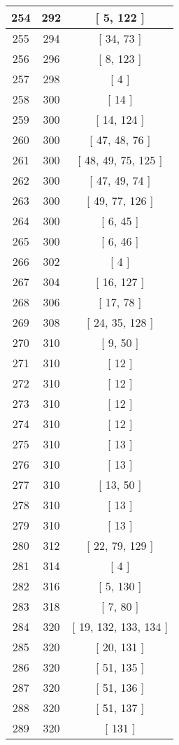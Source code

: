 \begin{center}
\begin{longtable}[H]{|| c c c ||}
\hline
254 & 292 & [ 5, 122 ] \\ 
\hline
255 & 294 & [ 34, 73 ] \\ 
\hline
256 & 296 & [ 8, 123 ] \\ 
\hline
257 & 298 & [ 4 ] \\ 
\hline
258 & 300 & [ 14 ] \\ 
\hline
259 & 300 & [ 14, 124 ] \\ 
\hline
260 & 300 & [ 47, 48, 76 ] \\ 
\hline
261 & 300 & [ 48, 49, 75, 125 ] \\ 
\hline
262 & 300 & [ 47, 49, 74 ] \\ 
\hline
263 & 300 & [ 49, 77, 126 ] \\ 
\hline
264 & 300 & [ 6, 45 ] \\ 
\hline
265 & 300 & [ 6, 46 ] \\ 
\hline
266 & 302 & [ 4 ] \\ 
\hline
267 & 304 & [ 16, 127 ] \\ 
\hline
268 & 306 & [ 17, 78 ] \\ 
\hline
269 & 308 & [ 24, 35, 128 ] \\ 
\hline
270 & 310 & [ 9, 50 ] \\ 
\hline
271 & 310 & [ 12 ] \\ 
\hline
272 & 310 & [ 12 ] \\ 
\hline
273 & 310 & [ 12 ] \\ 
\hline
274 & 310 & [ 12 ] \\ 
\hline
275 & 310 & [ 13 ] \\ 
\hline
276 & 310 & [ 13 ] \\ 
\hline
277 & 310 & [ 13, 50 ] \\ 
\hline
278 & 310 & [ 13 ] \\ 
\hline
279 & 310 & [ 13 ] \\ 
\hline
280 & 312 & [ 22, 79, 129 ] \\ 
\hline
281 & 314 & [ 4 ] \\ 
\hline
282 & 316 & [ 5, 130 ] \\ 
\hline
283 & 318 & [ 7, 80 ] \\ 
\hline
284 & 320 & [ 19, 132, 133, 134 ] \\ 
\hline
285 & 320 & [ 20, 131 ] \\ 
\hline
286 & 320 & [ 51, 135 ] \\ 
\hline
287 & 320 & [ 51, 136 ] \\ 
\hline
288 & 320 & [ 51, 137 ] \\ 
\hline
289 & 320 & [ 131 ] \\ 

\end{longtable}
\end{center}
